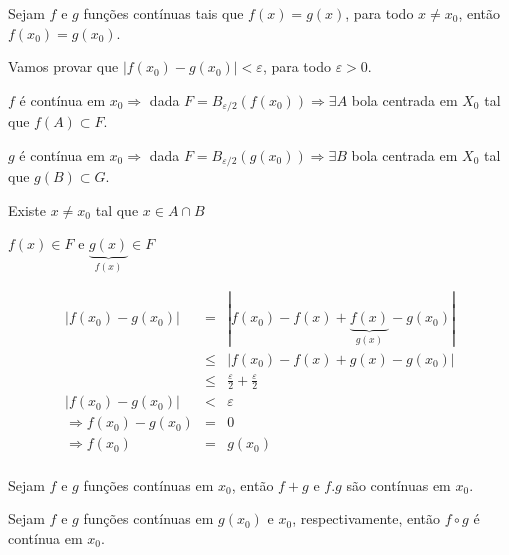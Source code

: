 \documentclass{book}
\begin{document}
\begin{teo}
Sejam $f$ e $g$ fun\c c\~oes cont\'inuas tais que $f(x)=g(x)$, para todo $x \ne x_0$, ent\~ao $f(x_0)=g(x_0)$.
\end{teo}

\begin{dem}
Vamos provar que $\left| {f\left( {x_0 } \right) - g\left( {x_0 } \right)} \right| < \varepsilon$, para todo $\varepsilon  > 0$.

$f$ \'e cont\'inua em $x_0 \Rightarrow$ dada $F = B_{\varepsilon /2} \left( {f\left( {x_0 } \right)} \right) \Rightarrow \exists A$ bola centrada em $X_0$ tal que $f\left( A \right) \subset F$.

$g$ \'e cont\'inua em $x_0 \Rightarrow$ dada $F = B_{\varepsilon /2} \left( {g\left( {x_0 } \right)} \right) \Rightarrow \exists B$ bola centrada em $X_0$ tal que $g\left( B \right) \subset G$.

Existe $x \ne x_0$ tal que $x \in A \cap B$

$f\left( x \right) \in F$ e $\underbrace {g\left( x \right)}_{f\left( x \right)} \in F$

\begin{eqnarray*}
\left| {f\left( {x_0 } \right) - g\left( {x_0 } \right)} \right| &=& \left| {f\left( {x_0 } \right) - f\left( x \right) + \underbrace {f\left( x \right)}_{g\left( x \right)} - g\left( {x_0 } \right)} \right| \\
&\leqslant& \left| {f\left( {x_0 } \right) - f\left( x \right) + g\left( x \right) - g\left( {x_0 } \right)} \right| \\
&\leqslant& \frac{\varepsilon }
{2} + \frac{\varepsilon }
{2} \\
\left| {f\left( {x_0 } \right) - g\left( {x_0 } \right)} \right| &<& \varepsilon  \\
\Rightarrow f\left( {x_0 } \right) - g\left( {x_0 } \right) &=& 0 \\
\Rightarrow f\left( {x_0 } \right) &=& g\left( {x_0 } \right) \\
\end{eqnarray*}
\end{dem}

\begin{teo}
Sejam $f$ e $g$ fun\c c\~oes cont\'inuas em $x_0$, ent\~ao $f+g$ e $f.g$ s\~ao cont\'inuas em $x_0$.
\end{teo}

\begin{teo}
Sejam $f$ e $g$ fun\c c\~oes cont\'inuas em $g(x_0)$ e $x_0$, respectivamente, ent\~ao $f \circ g$ \'e cont\'inua em $x_0$.
\end{teo}
\end{document}
